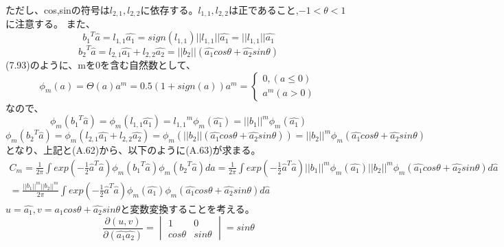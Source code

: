 \documentclass{jsarticle}
\begin{document}
ただし、cos,sinの符号は$l_{2, 1}, l_{2, 2}$に依存する。$l_{1, 1}, l_{2, 2}$は正であること,$-1<\theta<1$に注意する。
また、
\begin{equation}
{b_1}^T \hat{a} = l_{1, 1} \hat{a_1} = sign(l_{1, 1}) ||l_{1, 1}|| \hat{a_1} = ||l_{1, 1}|| \hat{a_1}
\end{equation}
\begin{equation}
{b_2}^T \hat{a} = l_{2, 1} \hat{a_1} + l_{2, 2} \hat{a_2} = ||b_2|| (\hat{a_1}cos\theta + \hat{a_2}sin\theta)
\end{equation}
(7.93)のように、mを0を含む自然数として、
\begin{equation}
\phi_m(a) = \Theta(a) a^m = 0.5(1 + sign(a)) a^m 
=\left\{
\begin{matrix}
0, (a \leq 0)\\
a^m (a > 0)
\end{matrix}
\right.
\end{equation}
なので、
\begin{equation}
\phi_m({b_1}^T \hat{a}) = \phi_m(l_{1, 1} \hat{a_1})
= {l_{1, 1}}^m \phi_m(\hat{a_1})
= ||b_1||^m \phi_m(\hat{a_1})
\end{equation}
\begin{equation}
\phi_m({b_2}^T \hat{a}) = \phi_m(l_{2, 1} \hat{a_1} + l_{2, 2} \hat{a_2})
= \phi_m(||b_2|| (\hat{a_1} cos\theta + \hat{a_2}sin\theta))
= ||b_2||^m \phi_m(\hat{a_1} cos\theta + \hat{a_2}sin\theta)
\end{equation}
となり、上記と(A.62)から、以下のように(A.63)が求まる。
\begin{equation}
\begin{split}
C_m = \frac{1}{2\pi} \int exp(-\frac{1}{2}\hat{a}^T \hat{a})\phi_m ({b_1}^T\hat{a}) \phi_m ({b_2}^T\hat{a}) d\hat{a}
= \frac{1}{2\pi} \int exp(-\frac{1}{2}\hat{a}^T \hat{a}) ||b_1||^m \phi_m (\hat{a_1}) ||b_2||^m \phi_m(\hat{a_1} cos\theta + \hat{a_2}sin\theta) d\hat{a}\\
= \frac{||b_1||^m ||b_2||^m }{2\pi} \int exp(-\frac{1}{2}\hat{a}^T \hat{a}) \phi_m (\hat{a_1}) \phi_m(\hat{a_1} cos\theta + \hat{a_2}sin\theta) d\hat{a}
\end{split}
\end{equation}
$u = \hat{a_1}, v = \hat{a_1}cos\theta + \hat{a_2}sin\theta$と変数変換することを考える。
\begin{equation}
\frac{\partial (u, v)}{\partial (\hat{a_1}\hat{a_2})} =
\begin{vmatrix}
1 & 0\\
cos\theta & sin\theta
\end{vmatrix}
= sin\theta
\end{equation}
\end{document}
